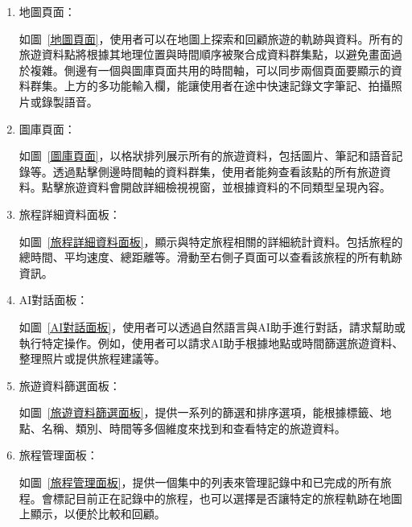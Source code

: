\begin{enumerate}

    \item 地圖頁面：

    如圖~\ref{地圖頁面}，使用者可以在地圖上探索和回顧旅遊的軌跡與資料。所有的旅遊資料點將根據其地理位置與時間順序被聚合成資料群集點，以避免畫面過於複雜。側邊有一個與圖庫頁面共用的時間軸，可以同步兩個頁面要顯示的資料群集。上方的多功能輸入欄，能讓使用者在途中快速記錄文字筆記、拍攝照片或錄製語音。

    \item 圖庫頁面：

    如圖~\ref{圖庫頁面}，以格狀排列展示所有的旅遊資料，包括圖片、筆記和語音記錄等。透過點擊側邊時間軸的資料群集，使用者能夠查看該點的所有旅遊資料。點擊旅遊資料會開啟詳細檢視視窗，並根據資料的不同類型呈現內容。

    \item 旅程詳細資料面板：

    如圖~\ref{旅程詳細資料面板}，顯示與特定旅程相關的詳細統計資料。包括旅程的總時間、平均速度、總距離等。滑動至右側子頁面可以查看該旅程的所有軌跡資訊。

    \item AI對話面板：

    如圖~\ref{AI對話面板}，使用者可以透過自然語言與AI助手進行對話，請求幫助或執行特定操作。例如，使用者可以請求AI助手根據地點或時間篩選旅遊資料、整理照片或提供旅程建議等。

    \item 旅遊資料篩選面板：

    如圖~\ref{旅遊資料篩選面板}，提供一系列的篩選和排序選項，能根據標籤、地點、名稱、類別、時間等多個維度來找到和查看特定的旅遊資料。

    \item 旅程管理面板：

    如圖~\ref{旅程管理面板}，提供一個集中的列表來管理記錄中和已完成的所有旅程。會標記目前正在記錄中的旅程，也可以選擇是否讓特定的旅程軌跡在地圖上顯示，以便於比較和回顧。

\end{enumerate}